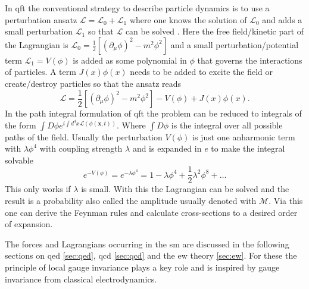 In \ac{qft} the conventional strategy to describe particle dynamics is to use a perturbation ansatz $\mathcal{L}=\mathcal{L}_0+\mathcal{L}_1$ where one knows the solution of $\mathcal{L}_0$ and adds a small perturbation $\mathcal{L}_1$ so that $\mathcal{L}$ can be solved \citep{zee2010quantum}. Here the free field/kinetic part of the Lagrangian is \mbox{$\mathcal{L}_0=\frac{1}{2}[(\partial_\mu \phi)^2 - m^2\phi^2] $} and a small perturbation/potential term $\mathcal{L}_1=V(\phi)$ is added as some polynomial in $\phi$ that governs the interactions of particles. A term $J(x)\phi(x)$ needs to be added to excite the field or create/destroy particles so that the ansatz reads
\begin{equation}
    \mathcal{L}=\frac{1}{2}[(\partial_\mu \phi)^2 - m^2\phi^2]
    -V(\phi) + J(x)\phi(x).
\end{equation}
In the path integral formulation of \ac{qft} the problem can be reduced to integrals of the form \mbox{$\int D\phi e^{i\int d^4x \mathcal{L}(\phi(\bm{x},t))}$}. Where $\int D\phi$ is the integral over all possible paths of the field. Usually the perturbation $V(\phi)$ is just one anharmonic term with $\lambda\phi^4$ with coupling strength $\lambda$ and is expanded in $e$ to make the integral solvable
\begin{equation}
    e^{-V(\phi)}=e^{-\lambda\phi^4}=1-\lambda\phi^4+\frac{1}{2}\lambda^2\phi^8+\dots
\end{equation}
This only works if $\lambda$ is small. With this the Lagrangian can be solved and the result is a probability also called the amplitude usually denoted with $\mathcal{M}$. Via this one can derive the Feynman rules and calculate cross-sections to a desired order of expansion.

The forces and Lagrangians occurring in the \ac{sm} are discussed in the following sections on \ac{qed} \ref{sec:qed}, \ac{qcd} \ref{sec:qcd} and the \ac{ew} theory \ref{sec:ew}. For these the principle of local gauge invariance plays a key role and is inspired by gauge invariance from classical electrodynamics.


